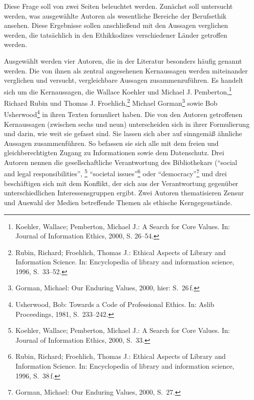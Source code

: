 \documentclass[output=paper]{langscibook}
\begin{document}
Diese Frage soll von zwei Seiten beleuchtet werden. Zunächst soll
untersucht werden, was ausgewählte Autoren als wesentliche Bereiche der
Berufsethik ansehen. Diese Ergebnisse sollen anschließend mit den
Aussagen verglichen werden, die tatsächlich in den Ethikkodizes
verschiedener Länder getroffen werden.

Ausgewählt werden vier Autoren, die in der Literatur besonders häufig
genannt werden. Die von ihnen als zentral angesehenen Kernaussagen
werden miteinander verglichen und versucht, vergleichbare Aussagen
zusammenzuführen. Es handelt sich um die Kernaussagen, die Wallace
Koehler und Michael J. Pemberton,\footnote{Koehler, Wallace; Pemberton,
  Michael J.: A Search for Core Values. In: Journal of Information
  Ethics, 2000, S. 26--54.} Richard Rubin und Thomas J.
Froehlich,\footnote{Rubin, Richard; Froehlich, Thomas J.: Ethical
  Aspects of Library and Information Science. In: Encyclopedia of
  library and information science, 1996, S.~33--52.} Michael
Gorman\footnote{Gorman, Michael: Our Enduring Values, 2000, hier: S.~26\,f.} sowie Bob Usherwood\footnote{Usherwood, Bob: Towards a Code of
  Professional Ethics. In: Aslib Proceedings, 1981, S.~233--242.} in
ihren Texten formuliert haben. Die von den Autoren getroffenen
Kernaussagen (zwischen sechs und neun) unterscheiden sich in ihrer
Formulierung und darin, wie weit sie gefasst sind. Sie lassen sich aber
auf sinngemäß ähnliche Aussagen zusammenführen. So befassen sie sich
alle mit dem freien und gleichberechtigten Zugang zu Informationen sowie
dem Datenschutz. Drei Autoren nennen die gesellschaftliche Verantwortung
des Bibliothekars (\enquote{social and legal responsibilities},
\footnote{Koehler, Wallace; Pemberton, Michael J.: A Search for Core
  Values. In: Journal of Information Ethics, 2000, S.~33.}
\enquote{societal issues}\footnote{Rubin, Richard; Froehlich, Thomas J.:
  Ethical Aspects of Library and Information Science. In: Encyclopedia
  of library and information science, 1996, S.~38\,f.} oder
\enquote{democracy}\footnote{Gorman, Michael: Our Enduring Values, 2000,
  S.~27.} und drei beschäftigen sich mit dem Konflikt, der sich aus der
Verantwortung gegenüber unterschiedlichen Interessensgruppen ergibt.
Zwei Autoren thematisieren Zensur und Auswahl der Medien betreffende
Themen als ethische Kerngegenstände.

\end{document}
